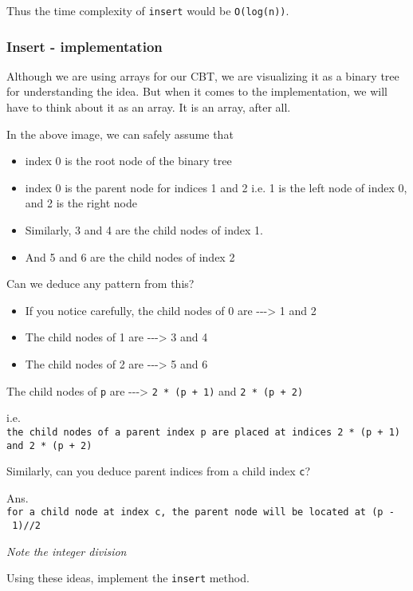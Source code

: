 \documentclass[11pt]{article}
\begin{document}
Thus the time complexity of \texttt{insert} would be \texttt{O(log(n))}.

    \subsubsection{Insert - implementation}\label{insert---implementation}

Although we are using arrays for our CBT, we are visualizing it as a
binary tree for understanding the idea. But when it comes to the
implementation, we will have to think about it as an array. It is an
array, after all.

In the above image, we can safely assume that

\begin{itemize}
\item
  index 0 is the root node of the binary tree
\item
  index 0 is the parent node for indices 1 and 2 i.e. 1 is the left node
  of index 0, and 2 is the right node
\item
  Similarly, 3 and 4 are the child nodes of index 1.
\item
  And 5 and 6 are the child nodes of index 2
\end{itemize}

Can we deduce any pattern from this?

\begin{itemize}
\item
  If you notice carefully, the child nodes of 0 are
  -\/-\/-\textgreater{} 1 and 2
\item
  The child nodes of 1 are -\/-\/-\textgreater{} 3 and 4
\item
  The child nodes of 2 are -\/-\/-\textgreater{} 5 and 6
\end{itemize}

The child nodes of \texttt{p} are -\/-\/-\textgreater{}
\texttt{2\ *\ (p\ +\ 1)} and \texttt{2\ *\ (p\ +\ 2)}

i.e.
\texttt{the\ child\ nodes\ of\ a\ parent\ index\ p\ are\ placed\ at\ indices\ 2\ *\ (p\ +\ 1)\ and\ 2\ *\ (p\ +\ 2)}

    Similarly, can you deduce parent indices from a child index \texttt{c}?

Ans.
\texttt{for\ a\ child\ node\ at\ index\ c,\ the\ parent\ node\ will\ be\ located\ at\ (p\ -\ 1)//2}

\emph{Note the integer division}

    Using these ideas, implement the \texttt{insert} method.
\end{document}
